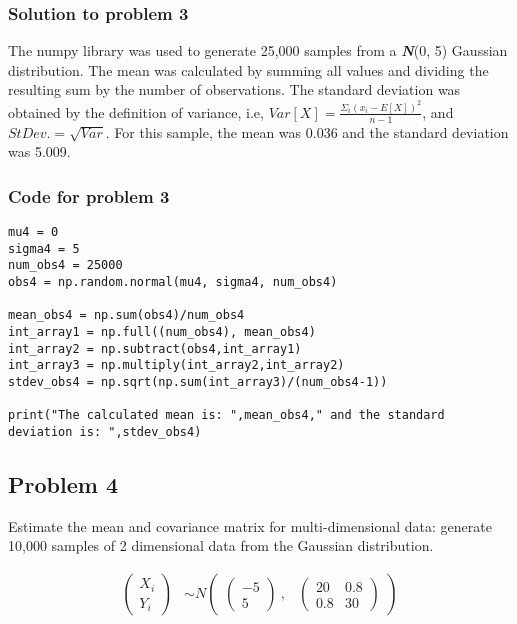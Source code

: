\documentclass[12pt]{article}%
\begin{document}
\subsubsection{Solution to problem 3}

The numpy library was used to generate 25,000 samples from a \textit{\textbf{N}}(0, 5) Gaussian distribution. The mean was calculated by summing all values and dividing the resulting sum by the number of observations. The standard deviation was obtained by the definition of variance, i.e, $Var[X] = \frac{\Sigma_i (x_i-E[X])^2}{n-1}$, and $StDev. = \sqrt{Var}$. For this sample, the mean was 0.036 and the standard deviation was 5.009.\\

\subsubsection{Code for problem 3}
\begin{lstlisting}
mu4 = 0
sigma4 = 5
num_obs4 = 25000
obs4 = np.random.normal(mu4, sigma4, num_obs4)

mean_obs4 = np.sum(obs4)/num_obs4
int_array1 = np.full((num_obs4), mean_obs4)
int_array2 = np.subtract(obs4,int_array1)
int_array3 = np.multiply(int_array2,int_array2)
stdev_obs4 = np.sqrt(np.sum(int_array3)/(num_obs4-1))

print("The calculated mean is: ",mean_obs4," and the standard deviation is: ",stdev_obs4)
\end{lstlisting}



\subsection{Problem 4}

Estimate the mean and covariance matrix for multi-dimensional data: generate 10,000 samples of 2 dimensional data from the Gaussian distribution. 

\begin{align*}
\begin{pmatrix}X_{i}\\
Y_{i}
\end{pmatrix} &\sim  N
\begin{pmatrix}
\begin{pmatrix}
-5\\
5
\end{pmatrix}\ ,&
\begin{pmatrix}
20 & 0.8\\
0.8 & 30
\end{pmatrix}
\end{pmatrix}\\
\end{align*}
\end{document}
